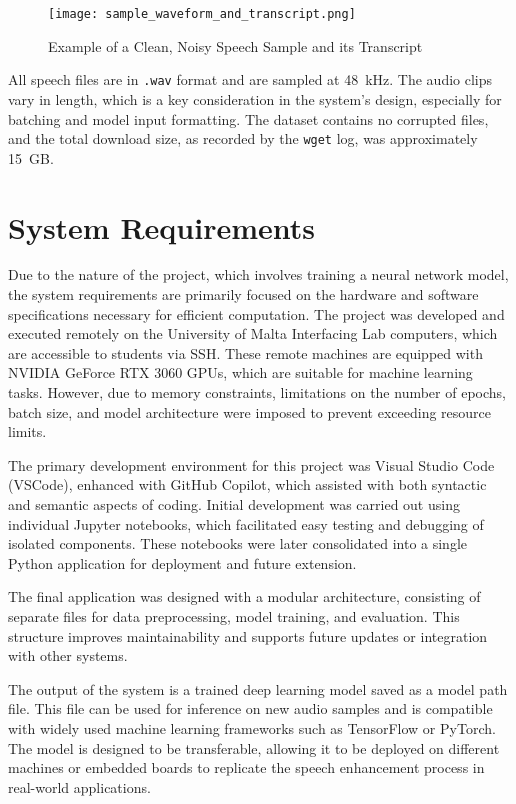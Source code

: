 \begin{figure}[H]
    \centering
    \texttt{[image: sample\_waveform\_and\_transcript.png]}
    \caption{Example of a Clean, Noisy Speech Sample and its Transcript}
    \label{fig:sample_waveform_and_transcript}
\end{figure}

All speech files are in \texttt{.wav} format and are sampled at 48~kHz. The audio clips vary in length, which is a key consideration in the system's design, especially for batching and model input formatting. The dataset contains no corrupted files, and the total download size, as recorded by the \texttt{wget} log, was approximately 15~GB.

\section{System Requirements}
\label{sec:system_requirements}

Due to the nature of the project, which involves training a neural network model, the system requirements are primarily focused on the hardware and software specifications necessary for efficient computation. The project was developed and executed remotely on the University of Malta Interfacing Lab computers, which are accessible to students via SSH. These remote machines are equipped with NVIDIA GeForce RTX 3060 GPUs, which are suitable for machine learning tasks. However, due to memory constraints, limitations on the number of epochs, batch size, and model architecture were imposed to prevent exceeding resource limits.

The primary development environment for this project was Visual Studio Code (VSCode), enhanced with GitHub Copilot, which assisted with both syntactic and semantic aspects of coding. Initial development was carried out using individual Jupyter notebooks, which facilitated easy testing and debugging of isolated components. These notebooks were later consolidated into a single Python application for deployment and future extension.

The final application was designed with a modular architecture, consisting of separate files for data preprocessing, model training, and evaluation. This structure improves maintainability and supports future updates or integration with other systems.

The output of the system is a trained deep learning model saved as a model path file. This file can be used for inference on new audio samples and is compatible with widely used  machine learning frameworks such as TensorFlow or PyTorch. The model is designed to be transferable, allowing it to be deployed on different machines or embedded boards to replicate the speech enhancement process in real-world applications.
